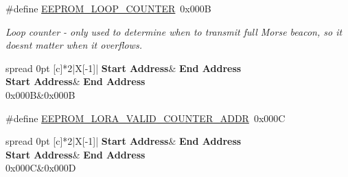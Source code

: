 \begin{DoxyCompactItemize}
\begin{DoxyCompactList}
\begin{longtabu}
\end{longtabu}
\end{DoxyCompactList}\item 
\mbox{\label{group__defines__eeprom__address__map_gaa512d20cb045b2b6e27676f5d3c9547f}} 
\#define \hyperlink{group__defines__eeprom__address__map_gaa512d20cb045b2b6e27676f5d3c9547f}{E\+E\+P\+R\+O\+M\+\_\+\+L\+O\+O\+P\+\_\+\+C\+O\+U\+N\+T\+ER}~0x000B
\begin{DoxyCompactList}\small\item\em Loop counter -\/ only used to determine when to transmit full Morse beacon, so it doesn\textquotesingle{}t matter when it overflows. \tabulinesep=1mm
\begin{longtabu} spread 0pt [c]{*{2}{|X[-1]}|}
\hline
\rowcolor{\tableheadbgcolor}\textbf{ Start Address}&\textbf{ End Address  }\\
\endfirsthead
\hline
\endfoot
\hline
\rowcolor{\tableheadbgcolor}\textbf{ Start Address}&\textbf{ End Address  }\\
\endhead
0x000B&0x000B \\
\end{longtabu}
\end{DoxyCompactList}\item 
\mbox{\label{group__defines__eeprom__address__map_gaa877b7e655f92a71a256bfb4406d4be7}} 
\#define \hyperlink{group__defines__eeprom__address__map_gaa877b7e655f92a71a256bfb4406d4be7}{E\+E\+P\+R\+O\+M\+\_\+\+L\+O\+R\+A\+\_\+\+V\+A\+L\+I\+D\+\_\+\+C\+O\+U\+N\+T\+E\+R\+\_\+\+A\+D\+DR}~0x000C
\begin{DoxyCompactList}\small\item\em \tabulinesep=1mm
\begin{longtabu} spread 0pt [c]{*{2}{|X[-1]}|}
\hline
\rowcolor{\tableheadbgcolor}\textbf{ Start Address}&\textbf{ End Address  }\\
\endfirsthead
\hline
\endfoot
\hline
\rowcolor{\tableheadbgcolor}\textbf{ Start Address}&\textbf{ End Address  }\\
\endhead
0x000C&0x000D \\
\end{longtabu}
\end{DoxyCompactList}\item 
\mbox{\label{group__defines__eeprom__address__map_ga09e7db19ac65e0c28bae5b46f25ffe36}} 

\end{DoxyCompactItemize}
